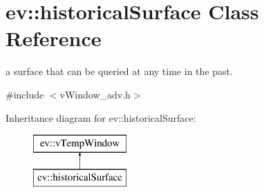 \hypertarget{classev_1_1historicalSurface}{}\section{ev\+:\+:historical\+Surface Class Reference}
\label{classev_1_1historicalSurface}


a surface that can be queried at any time in the past.  




{\ttfamily \#include $<$v\+Window\+\_\+adv.\+h$>$}

Inheritance diagram for ev\+:\+:historical\+Surface\+:\begin{figure}[H]
\begin{center}
\leavevmode
\includegraphics[height=2.000000cm]{classev_1_1historicalSurface}
\end{center}
\end{figure}

